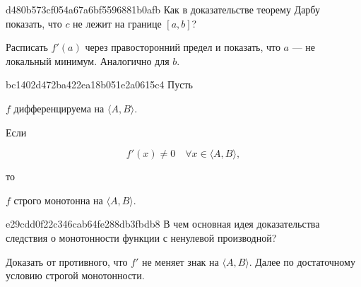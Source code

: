 \begin{note}{d480b573cf054a67a6bf5596881b0afb}
    Как в доказательстве теорему Дарбу показать, что \( c \) не лежит на границе \( [a, b] \)?

    \begin{cloze}{1}
        Расписать \( f'(a) \) через правосторонний предел и показать, что \( a \) --- не локальный минимум. Аналогично для \( b \).
    \end{cloze}
\end{note}

\begin{note}{bc1402d472ba422ea18b051e2a0615c4}
    Пусть \begin{icloze}{3}\( f \) дифференцируема на \( \langle A, B \rangle  \).\end{icloze} Если
    \begin{icloze}{2}\[
        f'(x) \neq 0 \quad \forall x \in \langle A, B \rangle,
    \]\end{icloze}
    то \begin{icloze}{1}\( f \) строго монотонна на \( \langle A, B \rangle  \).\end{icloze}
\end{note}

\begin{note}{e29cdd0f22c346cab64fe288db3fbdb8}
    В чем основная идея доказательства следствия о монотонности функции с ненулевой производной?

    \begin{cloze}{1}
        Доказать от противного, что \( f' \) не меняет знак на \( \langle A, B \rangle  \).
        Далее по достаточному условию строгой монотонности.
    \end{cloze}
\end{note}


